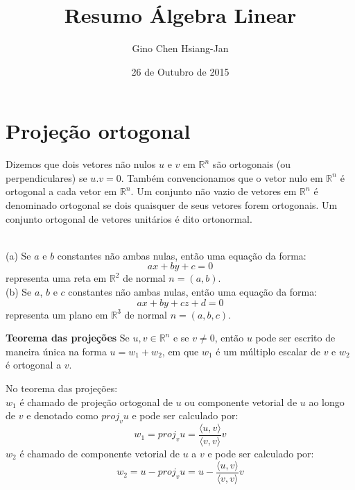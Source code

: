 \documentclass[10pt,a4paper]{article}
\author{Gino Chen Hsiang-Jan}
\title{Resumo Álgebra Linear}
\date{26 de Outubro de 2015}
\begin{document}
\maketitle
\tableofcontents

\newpage

\section{Projeção ortogonal}
\begin{definition}
Dizemos que dois vetores não nulos $u$ e $v$ em $\mathbb{R}^n$ são ortogonais (ou perpendiculares) se $u.v = 0$. Também convencionamos que o vetor nulo em $\mathbb{R}^n$ é ortogonal a cada vetor em $\mathbb{R}^n$. Um conjunto não vazio de vetores em $\mathbb{R}^n$ é denominado ortogonal se dois quaisquer de seus vetores forem ortogonais. Um conjunto ortogonal de vetores unitários é dito ortonormal.
\end{definition}

\begin{theorem}\\

(a) Se $a$ e $b$ constantes não ambas nulas, então uma equação da forma:\\
\[
	a x + b y + c = 0
\]
representa uma reta em $\mathbb{R}^2$ de normal $n = (a, b)$.\\

(b) Se $a$, $b$ e $c$ constantes não ambas nulas, então uma equação da forma:
\[
	a x + b y + c z + d = 0
\]
representa um plano em $\mathbb{R}^3$ de normal $n = (a, b, c)$.
\end{theorem}

\begin{theorem} \textbf{Teorema das projeções} Se $u, v \in \mathbb{R}^n$ e se $v \neq 0$, então $u$ pode ser escrito de maneira única na forma $u = w_1 + w_2$, em que $w_1$ é um múltiplo escalar de $v$ e $w_2$ é ortogonal a $v$.
\end{theorem}

\begin{definition} No teorema das projeções:\\
	$w_1$ é chamado de projeção ortogonal de $u$ ou componente vetorial de $u$ ao longo de $v$ e denotado como $proj_v u$ e pode ser calculado por: 
	\[
		w_1 = proj_v u = \frac{\langle u, v \rangle}{\langle v, v \rangle} v
	\]
	$w_2$ é chamado de componente vetorial de $u$ a $v$ e pode ser calculado por:
	\[
		w_2 = u - proj_v u = u - \frac{\langle u, v \rangle}{\langle v, v \rangle} v
	\]
\end{definition}
\end{document}
